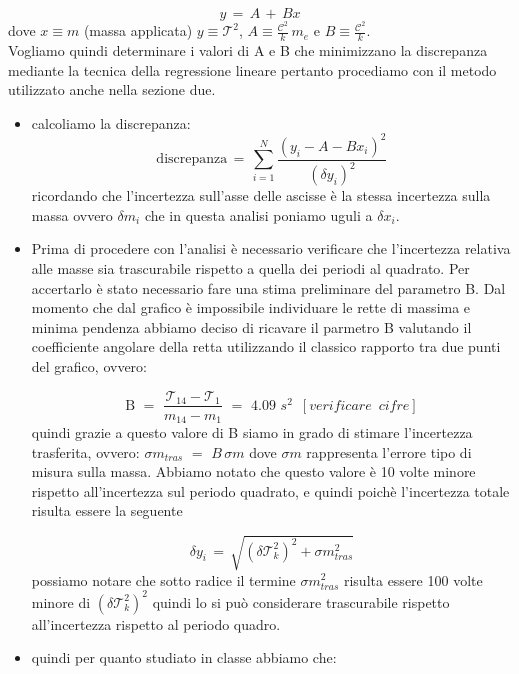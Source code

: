 \begin{equation}
	y \,=\, A \,+\, Bx
	\label{eq:pppar}
\end{equation}
%
dove $x \equiv m$ (massa applicata) $y \equiv \mathcal{T}^2$, $A \equiv \frac{\mathcal{C}^2}{k} \, m_e$ e $B \equiv \frac{\mathcal{C}^2}{k}$.\\
Vogliamo quindi determinare i valori di A e B che minimizzano la discrepanza mediante la tecnica della regressione lineare pertanto procediamo con il metodo utilizzato anche nella sezione due.
\begin{itemize}
\item{calcoliamo la discrepanza:
		\begin{equation*}
			\text{discrepanza} \,=\, \sum_{i=1}^{N} \frac{(y_i - A - Bx_i)^2}{(\delta y_i)^2}
		\end{equation*}
		ricordando che l'incertezza sull'asse delle ascisse è la stessa incertezza sulla massa ovvero $\delta m_i$ che in questa analisi poniamo uguli a $\delta x_i$.}
\item{Prima di procedere con l'analisi è necessario verificare che l'incertezza relativa alle masse sia trascurabile rispetto a quella dei periodi al quadrato. Per accertarlo è stato necessario fare una stima preliminare del parametro B. Dal momento che dal grafico è impossibile individuare le rette di massima e minima pendenza abbiamo deciso di ricavare il parmetro B valutando il coefficiente angolare della retta utilizzando il classico rapporto tra due punti del grafico, ovvero:

	\begin{equation*}
		\text{B} \,\,=\,\, \frac{\mathcal{T}_{14} - \mathcal{T}_{1}}{m_{14} - m_1} \,\,=\,\, 4.09 \,\, s^2 \,\,\,[verificare \,\,\,cifre]
	\end{equation*}
	quindi grazie a questo valore di B siamo in grado di stimare l'incertezza trasferita, ovvero: $\sigma m_{tras} \,\,=\,\, B \, \sigma m$ dove $\sigma m$ rappresenta l'errore tipo di misura sulla massa. Abbiamo notato che questo valore è 10 volte minore rispetto all'incertezza sul periodo quadrato, e quindi poichè l'incertezza totale risulta essere la seguente
	
	\begin{equation*}
		\delta y_i \,=\, \sqrt{(\delta \mathcal{T}_k^2)^2 + \sigma m_{tras}^2} 
	\end{equation*}	
	possiamo notare che sotto radice il termine $\sigma m_{tras}^2$ risulta essere 100 volte minore di $(\delta \mathcal{T}_k^2)^2$ quindi lo si può considerare trascurabile rispetto all'incertezza rispetto al periodo quadro.
	}
\item{quindi per quanto studiato in classe abbiamo che:

}
\end{itemize}
